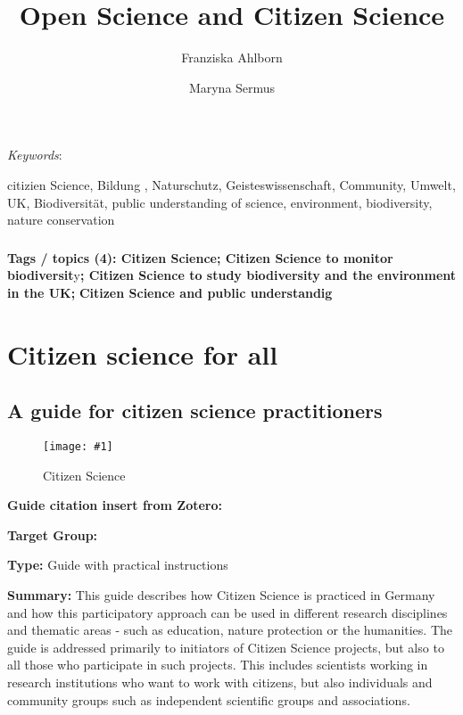 \documentclass{article}
\def\keywords{\vspace{.5em}
                
{\textit{Keywords}:\,\relax%
                
}}
\newcommand{\sep}{, }
\newlength{\imgwidth}
\newcommand\scaledgraphics[2]{%
                
\settowidth{\imgwidth}{\texttt{[image: \#1]}}%
                
\setlength{\imgwidth}{\minof{\imgwidth}{#2\textwidth}}%
                
\texttt{[image: \#1]}%
                
}
\begin{document}
\title{Open Science and Citizen Science}

\maketitle

\author{Franziska Ahlborn}
\author{Maryna Sermus}
\affil{}


\keywords{citizien Science\sep Bildung \sep Naturschutz\sep Geisteswissenschaft\sep Community\sep Umwelt\sep UK\sep Biodiversität\sep public understanding of science\sep environment\sep biodiversity\sep nature conservation}

\subsubsection{}\label{H1731420}



\textbf{Tags / topics (4): Citizen Science; Citizen Science to monitor biodiversit}y\textbf{; Citizen Science to study biodiversity and the environment in the UK;} \textbf{Citizen Science and public understandig}


\section{Citizen science for all}\label{H2662301}



\subsection{A guide for citizen science practitioners}\label{H9328356}



\begin{center}
\begin{figure}
\scaledgraphics{3cbbd8ed-7495-46a8-8cb5-114cf95cfb83.png}{0.5}
\caption*{Citizen Science}\label{F38618731}
\end{figure}


\end{center}





\textbf{Guide citation insert from Zotero:} \autocite{noauthor_citizen_2016}


\textbf{Target Group:}


\textbf{Type: }Guide with practical instructions


\textbf{Summary: }This guide describes how Citizen Science is practiced in Germany and how this participatory approach can be used in different research disciplines and thematic areas - such as education, nature protection or the humanities. The guide is addressed primarily to initiators of Citizen Science projects, but also to all those who participate in such projects. This includes scientists working in research institutions who want to work with citizens, but also individuals and community groups such as independent scientific groups and associations.
\end{document}
